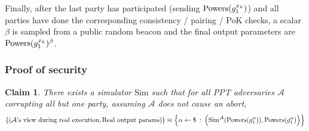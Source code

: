 \documentclass{article}
\newcommand{\?}{\stackrel{?}{=}}
\newtheorem{claim}{Claim}
\begin{document}
Finally, after the last party has participated (sending $\mathrm{Powers}(g_1^{x_k})$) and all parties have done the corresponding consistency / pairing / PoK checks, a scalar $\beta$ is sampled from a public random beacon and the final output parameters are $\mathrm{Powers}(g_1^{x_k})^\beta$.

\subsubsection*{Proof of security}
\newcommand{\Adv}{\mathcal{A}}
\newcommand{\Sim}{\mathrm{Sim}}
\begin{claim}
There exists a simulator $\Sim$ such that for all PPT adversaries $\Adv$ corrupting all but one party, assuming $\Adv$ does not cause an abort,
\[
\left\{ \left( \text{$\Adv$'s view during real execution}, \text{Real output params} \right) \right\}
\approx
\left\{ \alpha \gets \$ \::\: \left( \Sim^{\Adv}(\powers(g_1^\alpha)), \powers(g_1^\alpha) \right) \right\}
\]
\end{claim}
\end{document}

